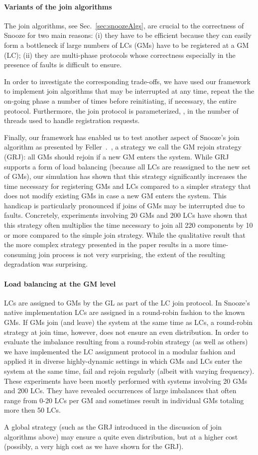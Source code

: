 \paragraph{Variants of the join algorithms}

The join algorithms, see Sec.~\ref{sec:snoozeAlgs}, are crucial to the
correctness of Snooze for two main reasons: (i) they have to be
efficient because they can easily form a bottleneck if large numbers
of LCs (GMs) have to be registered at a GM (LC); (ii) they are
multi-phase protocols whose correctness especially in the presence of
faults is difficult to ensure.

In order to investigate the corresponding trade-offs, we have used our
framework to implement join algorithms that may be interrupted at any
time, repeat the the on-going phase a number of times before
reinitiating, if necessary, the entire protocol. Furthermore, the join
protocol is parameterized, \eg, in the number of threads used to
handle registration requests.

Finally, our framework has enabled us to test another aspect of
Snooze's join algorithm as presented by
Feller~\etal.~\cite{feller:ccgrid12}, a strategy we call the GM rejoin
strategy (GRJ): all GMs should rejoin if a new GM enters the
system. While GRJ supports a form of load balancing (because all LCs
are reassigned to the new set of GMs), our simulation has shown that
this strategy significantly increases the time necessary for
registering GMs and LCs compared to a simpler strategy that does not
modify existing GMs in case a new GM enters the system. This handicap
is particularly pronounced if joins of GMs may be interrupted due to
faults. Concretely, experiments involving 20 GMs and 200 LCs have
shown that this strategy often multiplies the time necessary to join
all 220 components by 10 or more compared to the simple join
strategy. While the qualitative result that the more complex strategy
presented in the paper results in a more time-consuming join process
is not very surprising, the extent of the resulting degradation was
surprising.


\paragraph{Load balancing at the GM level}

LCs are assigned to GMs by the GL as part of the LC join protocol. In
Snooze's native implementation LCs are assigned in a round-robin
fashion to the known GMs. If GMs join (and leave) the system at the
same time as LCs, a round-robin strategy at join time, however, does
not ensure an even distribution. In order to evaluate the imbalance
resulting from a round-robin strategy (as well as others) we have
implemented the LC assignment protocol in a modular fashion and
applied it in diverse highly-dynamic settings in which GMs and LCs
enter the system at the same time, fail and rejoin regularly (albeit
with varying frequency). These experiments have been mostly performed
with systems involving 20 GMs and 200 LCs. They have revealed
occurrences of large imbalances that often range from 0-20 LCs per GM
and sometimes result in individual GMs totaling more then 50 LCs.

A global strategy (such as the GRJ introduced in the discussion of
join algorithms above) may ensure a quite even distribution, but at a
higher cost (possibly, a very high cost as we have shown for the GRJ).




